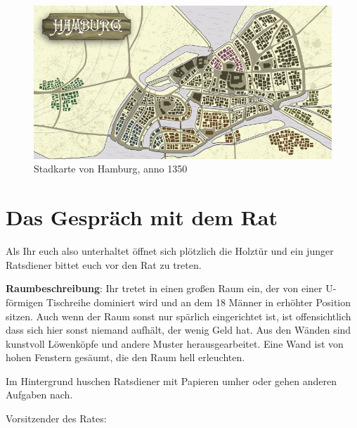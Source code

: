 \begin{figure}[t]
\begin{center}
	\includegraphics[scale=0.7]{./01-img/Karte.png}
	\caption{Stadkarte von Hamburg, anno 1350}
    	\label{fig:Karte}
\end{center}
\end{figure}


\section{Das Gespräch mit dem Rat}
\label{sec:ratsgespräch}

Als Ihr euch also unterhaltet öffnet sich plötzlich die Holztür und ein junger 
Ratsdiener bittet euch vor den Rat zu treten.

\textbf{Raumbeschreibung}: Ihr tretet in einen großen Raum ein, der von einer U-förmigen Tischreihe dominiert wird und an dem 18 Männer in erhöhter Position sitzen. Auch wenn der Raum sonst nur spärlich eingerichtet ist, ist offensichtlich dass sich hier sonst niemand aufhält, der wenig Geld hat. Aus den Wänden sind kunstvoll Löwenköpfe und andere Muster herausgearbeitet. Eine Wand ist von hohen Fenstern gesäumt, die den Raum hell erleuchten.

Im Hintergrund huschen Ratsdiener mit Papieren umher oder gehen anderen Aufgaben nach.


Vorsitzender des Rates:


